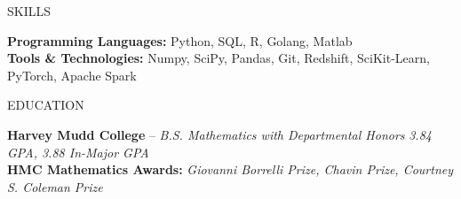 \documentclass{resume} %
\begin{document}

\begin{rSection}{SKILLS}

\textbf{Programming Languages:} Python, SQL, R, Golang, Matlab\\[0em]
\textbf{Tools \& Technologies:} Numpy, SciPy, Pandas, Git, Redshift, SciKit-Learn, PyTorch, Apache Spark

\end{rSection}


\begin{rSection}{EDUCATION}

{{\bf Harvey Mudd College} -- {\it B.S. Mathematics with Departmental Honors}} \hfill {\em 3.84 GPA, 3.88 In-Major GPA}\\[-1.75em]

\textbf{HMC Mathematics Awards:} {\it Giovanni Borrelli Prize, Chavin Prize, Courtney S. Coleman Prize} 

\end{rSection}
\end{document}
